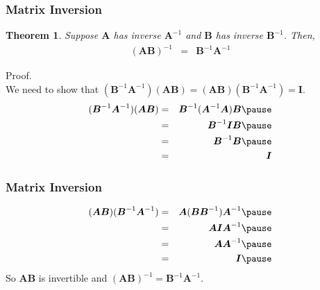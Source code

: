 \documentclass{beamer}
\newtheorem{thm}{Theorem}
\numberwithin{equation}{section}
\begin{document}
\begin{frame}
\frametitle{Matrix Inversion}

\begin{thm} Suppose $\boldsymbol{A}$ has inverse $\boldsymbol{A}^{-1}$ and $\boldsymbol{B}$ has inverse $\boldsymbol{B}^{-1}$.  Then, 
\begin{eqnarray}
(\boldsymbol{A} \boldsymbol{B})^{-1} & = & \boldsymbol{B}^{-1} \boldsymbol{A}^{-1} \nonumber 
\end{eqnarray}
\end{thm}

\pause 


Proof.\\
We need to show that $(\boldsymbol{B}^{-1} \boldsymbol{A}^{-1} ) (\boldsymbol{A} \boldsymbol{B}) = (\boldsymbol{A} \boldsymbol{B})(\boldsymbol{B}^{-1} \boldsymbol{A}^{-1}) = \boldsymbol{I}$. \pause  
\begin{eqnarray}
(\boldsymbol{B}^{-1} \boldsymbol{A}^{-1} ) (\boldsymbol{A} \boldsymbol{B})  &  = & \boldsymbol{B}^{-1} (\boldsymbol{A}^{-1}  \boldsymbol{A}) \boldsymbol{B} \nonumber \pause \\
& = & \boldsymbol{B}^{-1} \boldsymbol{I} \boldsymbol{B} \nonumber \pause \\
& = & \boldsymbol{B}^{-1} \boldsymbol{B}\nonumber \pause \\
& = & \boldsymbol{I}\nonumber 
\end{eqnarray}

\end{frame}

\begin{frame}
\frametitle{Matrix Inversion}

\begin{eqnarray}
(\boldsymbol{A} \boldsymbol{B})(\boldsymbol{B}^{-1} \boldsymbol{A}^{-1}) & = & \boldsymbol{A} (\boldsymbol{B}\boldsymbol{B}^{-1})  \boldsymbol{A}^{-1} \nonumber \pause \\
& = & \boldsymbol{A} \boldsymbol{I} \boldsymbol{A}^{-1} \nonumber \pause \\
& = & \boldsymbol{A} \boldsymbol{A}^{-1} \nonumber \pause \\
& = & \boldsymbol{I} \nonumber \pause
\end{eqnarray}
So $\boldsymbol{A}\boldsymbol{B} $ is invertible and $(\boldsymbol{A}\boldsymbol{B} )^{-1}   = \boldsymbol{B}^{-1} \boldsymbol{A}^{-1} $.

\end{frame}
\end{document}
